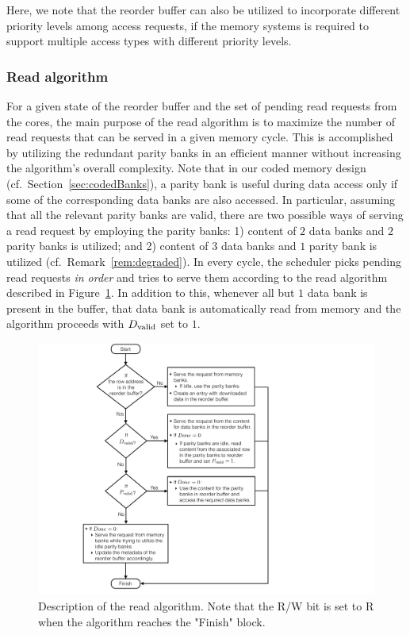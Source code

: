 \begin{remark}
\label{rem:priority}
Here, we note that the reorder buffer can also be utilized to incorporate different priority levels among access requests, if the memory systems is required to support multiple access types with different priority levels.
\end{remark}


\subsubsection{Read algorithm}
\label{sec:read}

For a given state of the reorder buffer and the set of pending read requests from the cores, the main purpose of the read algorithm is to maximize the number of read requests that can be served in a given memory cycle. This is accomplished by utilizing the redundant parity banks in an efficient manner without increasing the algorithm's overall complexity. Note that in our coded memory design (cf.~Section~\ref{sec:codedBanks}), a parity bank is useful during data access only if some of the corresponding data banks are also accessed. In particular, assuming that all the relevant parity banks are valid, there are two possible ways of serving a read request by employing the parity banks: 1) content of $2$ data banks and $2$ parity banks is utilized; and  2) content of $3$ data banks and $1$ parity bank is utilized (cf.~Remark~\ref{rem:degraded}). In every cycle, the scheduler picks pending read requests {\em in order} and tries to serve them according to the read algorithm described in Figure~\ref{fig:read}. In addition to this, whenever all but $1$ data bank is present in the buffer, that data bank is automatically read from memory and the algorithm proceeds with $D_{\rm valid}$ set to $1$. 
\begin{figure}[h!] \centering
\includegraphics[width=0.85\linewidth]{figures/Read-algo-new.pdf} 
\caption{Description of the read algorithm. Note that the R/W bit is set to R when the algorithm reaches the "Finish" block.}

\label{fig:read}
\end{figure}

